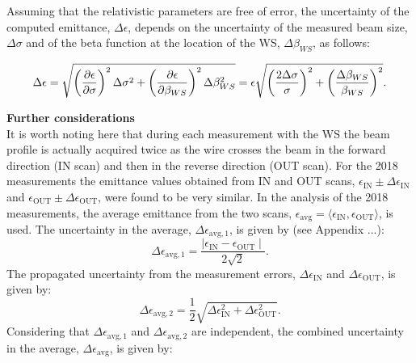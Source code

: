 Assuming that the relativistic parameters are free of error, the uncertainty of the computed emittance, $\Delta \epsilon$, depends on the uncertainty of the measured beam size, $\Delta \sigma$ and of the beta function at the location of the WS, $\Delta \beta_{WS}$, as follows:

\begin{equation}\label{eq:emittance_from_WS_uncertainty}
   \centering
   \Delta \epsilon = \sqrt{\left ( \frac{\partial \epsilon}{\partial \sigma}\right )^2 \Delta \sigma^2 + \left ( \frac{\partial \epsilon}{\partial \beta_{WS}} \right )^2 \Delta \beta_{WS}^2} = \epsilon  \sqrt{\left ( \frac{2 \Delta \sigma}{\sigma}\right )^2 + \left ( \frac{ \Delta \beta_{WS}}{\beta_{WS}} \right )^2} .
\end{equation}

\normalsize{\textbf{Further considerations}}\\
It is worth noting here that during each measurement with the WS the beam profile is actually acquired twice as the wire crosses the beam in the forward direction (IN scan) and then in the reverse direction (OUT scan). For the 2018 measurements the emittance values obtained from IN and OUT scans, $\epsilon_\mathrm{IN} \pm \Delta \epsilon_\mathrm{IN}$ and $\epsilon_\mathrm{OUT} \pm \Delta \epsilon_\mathrm{OUT}$, were found to be very similar. In the analysis of the 2018 measurements, the average emittance from the two scans, $\epsilon_\mathrm{avg} = \langle \epsilon_\mathrm{IN}, \epsilon_\mathrm{OUT}\rangle$, is used. The uncertainty in the average, $\Delta \epsilon_\mathrm{avg, 1}$, is given by (see Appendix ...): 
\begin{equation}\label{eq:uncertainty_mean_ws}
   \Delta \epsilon_\mathrm{avg, 1} = \frac{\mid \epsilon_\mathrm{IN} - \epsilon_\mathrm{OUT} \mid}{2 \sqrt{2}}.
\end{equation}
The propagated uncertainty from the measurement errors, $\Delta \epsilon_\mathrm{IN}$ and $\Delta \epsilon_\mathrm{OUT}$, is given by:
\begin{equation}\label{eq:propagated_uncertainty_ws}
   \Delta \epsilon_\mathrm{avg, 2} = \frac{1}{2}\sqrt{ \Delta \epsilon_\mathrm{IN}^2 + \Delta \epsilon_\mathrm{OUT}^2}.
\end{equation}
Considering that $\Delta \epsilon_\mathrm{avg, 1}$ and $\Delta \epsilon_\mathrm{avg, 2}$ are independent, the combined uncertainty in the average, $\Delta \epsilon_\mathrm{avg}$, is given by:

